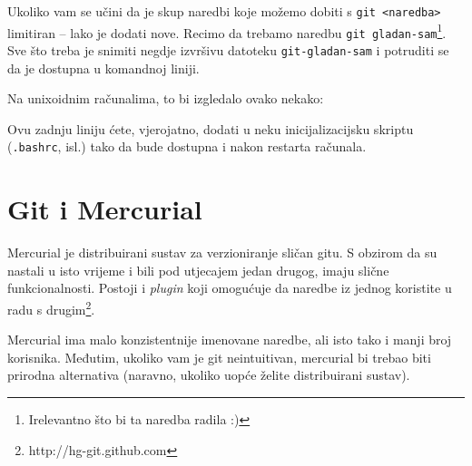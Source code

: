 Ukoliko vam se učini da je skup naredbi koje možemo dobiti s \verb+git <naredba>+ limitiran -- lako je dodati nove.
Recimo da trebamo naredbu \verb+git gladan-sam+\footnote{Irelevantno što bi ta naredba radila :)}.
Sve što treba je snimiti negdje izvršivu datoteku \verb+git-gladan-sam+ i potruditi se da je dostupna u komandnoj liniji.

Na unixoidnim računalima, to bi izgledalo ovako nekako:


Ovu zadnju liniju ćete, vjerojatno, dodati u neku inicijalizacijsku skriptu (\verb+.bashrc+, isl.) tako da bude dostupna i nakon restarta računala.

%
%
%

%

\section*{Git i Mercurial}

Mercurial je distribuirani sustav za verzioniranje sličan gitu.
S obzirom da su nastali u isto vrijeme i bili pod utjecajem jedan drugog, imaju slične funkcionalnosti.
Postoji i \emph{plugin} koji omogućuje da naredbe iz jednog koristite u radu s drugim\footnote{http://hg-git.github.com}.

Mercurial ima malo konzistentnije imenovane naredbe, ali isto tako i manji broj korisnika.
Međutim, ukoliko vam je git neintuitivan, mercurial bi trebao biti prirodna alternativa (naravno, ukoliko uopće želite distribuirani sustav).

